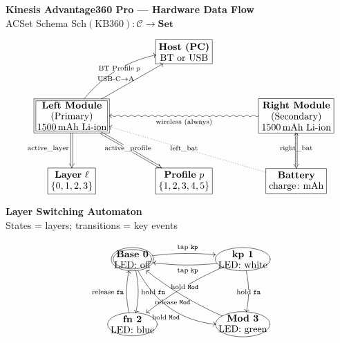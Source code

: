 \documentclass[border=10pt]{standalone}
\begin{document}
\begin{minipage}{16cm}
\begin{center}
\textbf{\large Kinesis Advantage360 Pro — Hardware Data Flow}\\[6pt]
\small ACSet Schema $\mathrm{Sch}(\text{KB360})\colon \mathcal{C} \to \mathbf{Set}$
\end{center}

\vspace{8pt}

\[
\xymatrix@R=3pc@C=4pc{
  & *+[F]\txt{\textbf{Host (PC)}\\BT or USB} & \\
  *+[F=]\txt{\textbf{Left Module}\\(Primary)\\1500\,mAh Li-ion}
    \ar[ur]^{\text{USB-C}\to\text{A}}
    \ar@/^1.5pc/[ur]|{\text{BT Profile}\;p}
    \ar@{=>}[d]_{\text{active\_layer}}
    \ar@{=>}[dr]|{\text{active\_profile}}
  & &
  *+[F]\txt{\textbf{Right Module}\\(Secondary)\\1500\,mAh Li-ion}
    \ar@{~>}[ll]^{\text{wireless (always)}}
    \ar@{=>}[d]
  \\
  *+[F-]\txt{\textbf{Layer} $\ell$\\$\{0,1,2,3\}$}
  &
  *+[F-]\txt{\textbf{Profile} $p$\\$\{1,2,3,4,5\}$}
  &
  *+[F-]\txt{\textbf{Battery}\\$\text{charge}\colon \text{mAh}$}
    \ar@{.>}[ull]|{\text{left\_bat}}
    \ar@{.>}[u]|{\text{right\_bat}}
}
\]

\vspace{12pt}


\begin{center}
\textbf{\large Layer Switching Automaton}\\[4pt]
\small States = layers; transitions = key events
\end{center}

\vspace{8pt}

\[
\xymatrix@R=3.5pc@C=5pc{
  *+[o][F=]{\txt{\textbf{Base 0}\\LED: off}}
    \ar@/^/[r]^{\text{tap}\;\mathtt{kp}}
    \ar@/^/[d]^{\text{hold}\;\mathtt{fn}}
    \ar@/_2pc/[dr]_{\text{hold}\;\mathtt{Mod}}
  &
  *+[o][F-]{\txt{\textbf{kp 1}\\LED: white}}
    \ar@/^/[l]^{\text{tap}\;\mathtt{kp}}
    \ar@/^/[d]|{\text{hold}\;\mathtt{fn}}
    \ar@/_/[dl]|{\text{hold}\;\mathtt{Mod}}
  \\
  *+[o][F-]{\txt{\textbf{fn 2}\\LED: blue}}
    \ar@/^/[u]^{\text{release}\;\mathtt{fn}}
  &
  *+[o][F-]{\txt{\textbf{Mod 3}\\LED: green}}
    \ar@/^/[ul]^{\text{release}\;\mathtt{Mod}}
}
\]


\end{minipage}
\end{document}
